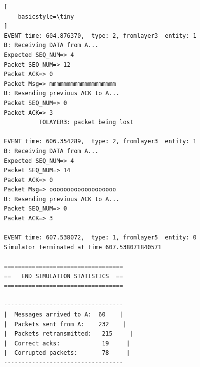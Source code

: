 \documentclass[a4paperr]{article}
\begin{document}
\begin{lstlisting}[
    basicstyle=\tiny
]
EVENT time: 604.876370,  type: 2, fromlayer3  entity: 1
B: Receiving DATA from A...
Expected SEQ_NUM=> 4
Packet SEQ_NUM=> 12
Packet ACK=> 0
Packet Msg=> mmmmmmmmmmmmmmmmmmm
B: Resending previous ACK to A...
Packet SEQ_NUM=> 0
Packet ACK=> 3
          TOLAYER3: packet being lost

EVENT time: 606.354289,  type: 2, fromlayer3  entity: 1
B: Receiving DATA from A...
Expected SEQ_NUM=> 4
Packet SEQ_NUM=> 14
Packet ACK=> 0
Packet Msg=> ooooooooooooooooooo
B: Resending previous ACK to A...
Packet SEQ_NUM=> 0
Packet ACK=> 3

EVENT time: 607.538072,  type: 1, fromlayer5  entity: 0
Simulator terminated at time 607.538071840571
 
==================================
==   END SIMULATION STATISTICS  ==
==================================
 
----------------------------------
|  Messages arrived to A:  60    |
|  Packets sent from A:    232    |
|  Packets retransmitted:   215     |
|  Correct acks:            19     |
|  Corrupted packets:       78     |
----------------------------------

\end{lstlisting}
\end{document}
